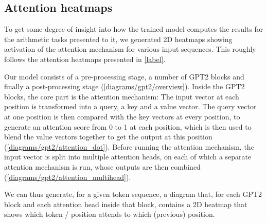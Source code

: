 \subsection{Attention heatmaps}
\label{methods:heatmap}

To get some degree of insight into how the trained model computes the results for the arithmetic tasks presented to it, we generated 2D heatmaps showing activation of the attention mechanism for various input sequences. This roughly follows the attention heatmaps presented in \cref{label}.

Our model consists of a pre-processing stage, a number of GPT2 blocks and finally a post-processing stage (\cref{diagrams/gpt2/overview}). Inside the GPT2 blocks, the core part is the attention mechanism: The input vector at each position is transformed into a query, a key and a value vector. The query vector at one position is then compared with the key vectors at every position, to generate an attention score from 0 to 1 at each position, which is then used to blend the value vectors together to get the output at this position (\cref{diagrams/gpt2/attention_dot}).
Before running the attention mechanism, the input vector is split into multiple attention heads, on each of which a separate attention mechanism is run, whose outputs are then combined (\cref{diagrams/gpt2/attention_multihead}).

We can thus generate, for a given token sequence,
a diagram that, for each GPT2 block and each attention head inside that block, contains a 2D heatmap that shows which token / position attends to which (previous) position.

